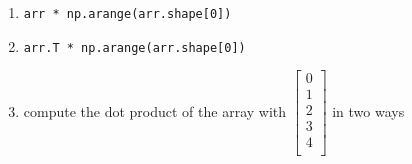 \documentclass{article}
\newcounter{points}
\newcommand\printpoints{Total number of points: \thepoints}
\begin{document}
\begin{enumerate}
\begin{enumerate}
\item 
\begin{verbatim}
arr * np.arange(arr.shape[0])
\end{verbatim}


\item 
\begin{verbatim}
arr.T * np.arange(arr.shape[0])
\end{verbatim}

\item compute the dot product of the array with $\begin{bmatrix}
0\\
1\\
2\\
3\\
4\\
\end{bmatrix}$
in two ways
\end{enumerate}

\end{enumerate}
\end{document}
